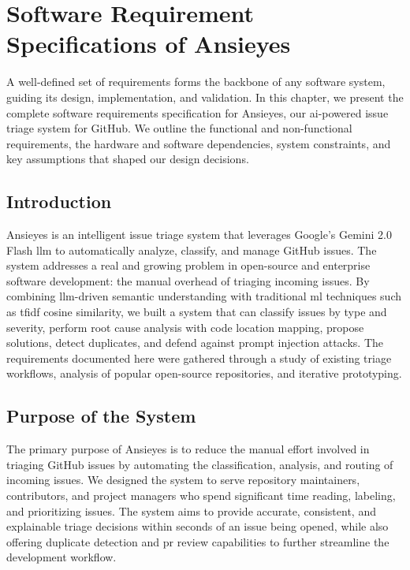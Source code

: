 \chapter{Software Requirement Specifications of Ansieyes}

A well-defined set of requirements forms the backbone of any software system, guiding its design, implementation, and validation. In this chapter, we present the complete software requirements specification for Ansieyes, our \gls{ai}-powered issue triage system for GitHub. We outline the functional and non-functional requirements, the hardware and software dependencies, system constraints, and key assumptions that shaped our design decisions.

\section{Introduction}

Ansieyes is an intelligent issue triage system that leverages Google's Gemini 2.0 Flash \gls{llm} to automatically analyze, classify, and manage GitHub issues. The system addresses a real and growing problem in open-source and enterprise software development: the manual overhead of triaging incoming issues. By combining \gls{llm}-driven semantic understanding with traditional \gls{ml} techniques such as \gls{tfidf} cosine similarity, we built a system that can classify issues by type and severity, perform root cause analysis with code location mapping, propose solutions, detect duplicates, and defend against prompt injection attacks. The requirements documented here were gathered through a study of existing triage workflows, analysis of popular open-source repositories, and iterative prototyping.

\section{Purpose of the System}

The primary purpose of Ansieyes is to reduce the manual effort involved in triaging GitHub issues by automating the classification, analysis, and routing of incoming issues. We designed the system to serve repository maintainers, contributors, and project managers who spend significant time reading, labeling, and prioritizing issues. The system aims to provide accurate, consistent, and explainable triage decisions within seconds of an issue being opened, while also offering duplicate detection and \gls{pr} review capabilities to further streamline the development workflow.

